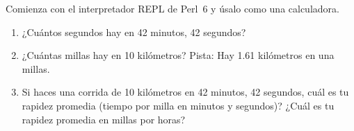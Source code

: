\begin{exercise}

Comienza con el interpretador REPL de Perl~6 y úsalo como una calculadora.

\begin{enumerate}

\item ¿Cuántos segundos hay en 42 minutos, 42 segundos?

\item ¿Cuántas millas hay en 10  kilómetros? Pista: Hay 1.61
  kilómetros en una millas.

\item Si haces una corrida de 10 kilómetros en 42 minutos, 42 segundos,
 cuál es tu rapidez promedia (tiempo por milla en minutos y segundos)? 
 ¿Cuál es tu rapidez promedia en millas por horas?


\end{enumerate}

\end{exercise}


